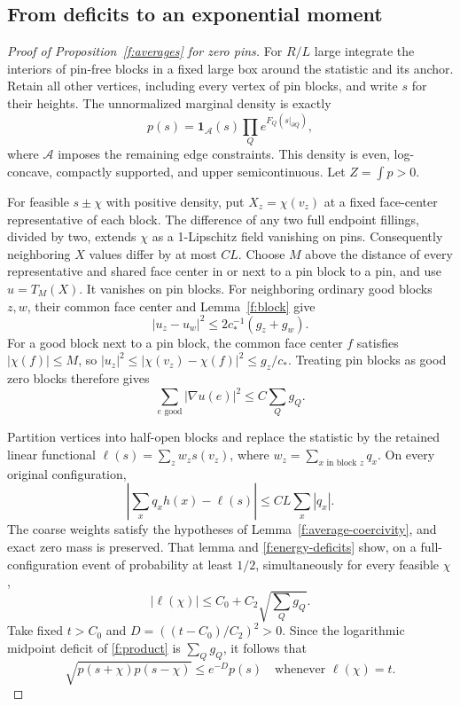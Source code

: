 \subsection{From deficits to an exponential moment}
\begin{proof}[Proof of Proposition~\ref{f:averages} for zero pins]
For $R/L$ large integrate the interiors of pin-free blocks in a fixed
large box around the statistic and its anchor. Retain all other vertices,
including every vertex of pin blocks, and write $s$ for their heights.
The unnormalized marginal density is exactly
\begin{equation}\label{f:product}
 p(s)=\mathbf1_{\mathcal A}(s)\prod_Q e^{F_Q(s|_{\partial Q})},
\end{equation}
where $\mathcal A$ imposes the remaining edge constraints. This density is
even, log-concave, compactly supported, and upper semicontinuous. Let
$Z=\int p>0$.

For feasible $s\pm\chi$ with positive density, put $X_z=\chi(v_z)$ at
a fixed face-center representative of each block. The difference of any
two full endpoint fillings, divided by two, extends $\chi$ as a
1-Lipschitz field vanishing on pins. Consequently neighboring $X$ values
differ by at most $CL$. Choose $M$ above the distance of every representative
and shared face center in or next to a pin block to a pin, and use
$u=T_M(X)$. It vanishes on pin blocks. For neighboring ordinary good blocks
$z,w$, their common face center and Lemma~\ref{f:block} give
\[
 |u_z-u_w|^2\le2c_*^{-1}(g_z+g_w).
\]
For a good block next to a pin block, the common face center $f$ satisfies
$|\chi(f)|\le M$, so $|u_z|^2\le|\chi(v_z)-\chi(f)|^2\le g_z/c_*$.
Treating pin blocks as good zero blocks therefore gives
\begin{equation}\label{f:energy-deficits}
 \sum_{e\text{ good}}|\nabla u(e)|^2\le C\sum_Q g_Q.
\end{equation}

Partition vertices into half-open blocks and replace the statistic by
the retained linear functional $\ell(s)=\sum_z w_zs(v_z)$, where
$w_z=\sum_{x\text{ in block }z}q_x$. On every original configuration,
\begin{equation}\label{f:representative-error}
 \left|\sum_xq_xh(x)-\ell(s)\right|\le CL\sum_x|q_x|.
\end{equation}
The coarse weights satisfy the hypotheses of
Lemma~\ref{f:average-coercivity}, and exact zero mass is preserved.
That lemma and \eqref{f:energy-deficits} show, on a full-configuration
event of probability at least $1/2$, simultaneously for every feasible
$\chi$,
\[
 |\ell(\chi)|\le C_0+C_2\sqrt{\sum_Qg_Q}.
\]
Take fixed $t>C_0$ and $D=((t-C_0)/C_2)^2>0$. Since the logarithmic
midpoint deficit of \eqref{f:product} is $\sum_Qg_Q$, it follows that
\begin{equation}\label{f:pointwise-overlap}
 \sqrt{p(s+\chi)p(s-\chi)}\le e^{-D}p(s)
 \quad\text{whenever }\ell(\chi)=t.
\end{equation}


\end{proof}
